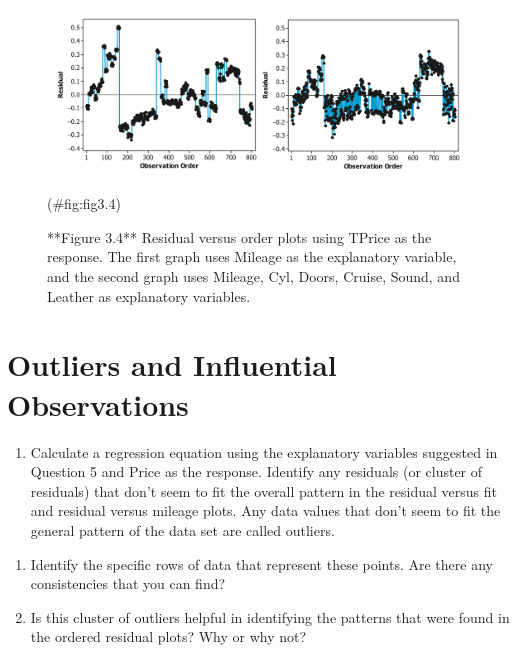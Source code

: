 \documentclass[
]{report}
\providecommand{\tightlist}{%
  \setlength{\itemsep}{0pt}\setlength{\parskip}{0pt}}
\begin{document}
\begin{figure}

{\centering \includegraphics[width=1\linewidth]{docs/Fig3_4} 

}

\caption{**Figure 3.4** Residual versus order plots using TPrice as the response. The first graph uses Mileage as the explanatory variable, and the second graph uses Mileage, Cyl, Doors, Cruise, Sound, and Leather as explanatory variables.}(\#fig:fig3.4)
\end{figure}

\section*{Outliers and Influential Observations}\label{outliers-and-influential-observations}

\begin{enumerate}
\def\labelenumi{\arabic{enumi}.}
\setcounter{enumi}{10}
\tightlist
\item
  Calculate a regression equation using the explanatory variables suggested in Question 5 and Price as the response. Identify any residuals (or cluster of residuals) that don't seem to fit the overall pattern in the residual versus fit and residual versus mileage plots. Any data values that don't seem to fit the general pattern of the data set are called outliers.
\end{enumerate}

\begin{enumerate}
\def\labelenumi{\alph{enumi}.}
\item
  Identify the specific rows of data that represent these points. Are there any consistencies that you can find?
\item
  Is this cluster of outliers helpful in identifying the patterns that were found in the ordered residual plots? Why or why not?
\end{enumerate}
\end{document}

